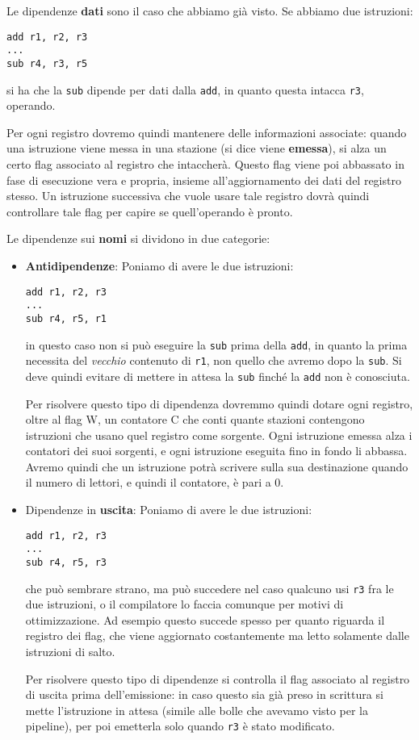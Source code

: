 \documentclass[a4paper,11pt]{article}
\begin{document}
Le dipendenze \textbf{dati} sono il caso che abbiamo già visto.
Se abbiamo due istruzioni:
\begin{lstlisting}	
add r1, r2, r3
...
sub r4, r3, r5
\end{lstlisting}
si ha che la \lstinline|sub| dipende per dati dalla \lstinline|add|, in quanto questa intacca \lstinline|r3|, operando.

Per ogni registro dovremo quindi mantenere delle informazioni associate: quando una istruzione viene messa in una stazione (si dice viene \textbf{emessa}), si alza un certo flag associato al registro che intaccherà. 
Questo flag viene poi abbassato in fase di esecuzione vera e propria, insieme all'aggiornamento dei dati del registro stesso.
Un istruzione successiva che vuole usare tale registro dovrà quindi controllare tale flag per capire se quell'operando è pronto.

Le dipendenze sui \textbf{nomi} si dividono in due categorie:
\begin{itemize}
	\item \textbf{Antidipendenze}:
	Poniamo di avere le due istruzioni:
\begin{lstlisting}
add r1, r2, r3
...
sub r4, r5, r1
\end{lstlisting}
in questo caso non si può eseguire la \lstinline|sub| prima della \lstinline|add|, in quanto la prima necessita del \textit{vecchio} contenuto di \lstinline|r1|, non quello che avremo dopo la \lstinline|sub|.
Si deve quindi evitare di mettere in attesa la \lstinline|sub| finché la \lstinline|add| non è conosciuta.

Per risolvere questo tipo di dipendenza dovremmo quindi dotare ogni registro, oltre al flag W, un contatore C che conti quante stazioni contengono istruzioni che usano quel registro come sorgente.
Ogni istruzione emessa alza i contatori dei suoi sorgenti, e ogni istruzione eseguita fino in fondo li abbassa.
Avremo quindi che un istruzione potrà scrivere sulla sua destinazione quando il numero di lettori, e quindi il contatore, è pari a 0.

	\item Dipendenze in \textbf{uscita}:
		Poniamo di avere le due istruzioni:
\begin{lstlisting}
add r1, r2, r3
...
sub r4, r5, r3
\end{lstlisting}
che può sembrare strano, ma può succedere nel caso qualcuno usi \lstinline|r3| fra le due istruzioni, o il compilatore lo faccia comunque per motivi di ottimizzazione.
Ad esempio questo succede spesso per quanto riguarda il registro dei flag, che viene aggiornato costantemente ma letto solamente dalle istruzioni di salto. 

Per risolvere questo tipo di dipendenze si controlla il flag associato al registro di uscita prima dell'emissione: in caso questo sia già preso in scrittura si mette l'istruzione in attesa (simile alle bolle che avevamo visto per la pipeline), per poi emetterla solo quando \lstinline|r3| è stato modificato. 
\end{itemize}
\end{document}
